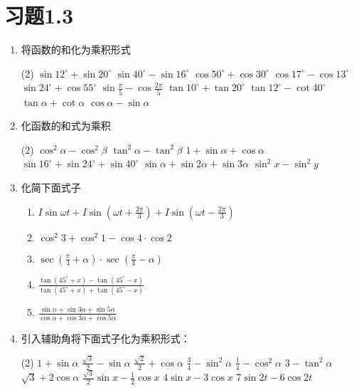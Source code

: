 \section*{习题1.3}
\begin{enumerate}
    \item 将函数的和化为乘积形式
    \begin{tasks}(2)
    \task $\sin 12^{\circ}+\sin 20^{\circ}$
    \task $\sin 40^{\circ}-\sin 16^{\circ}$
    \task $\cos 50^{\circ}+\cos 30^{\circ}$
    \task $\cos 17^{\circ}-\cos 13^{\circ} $
    \task $\sin 24^{\circ}+\cos 55^{\circ}$
    \task $\sin \frac{\pi}{5}-\cos \frac{2 \pi}{5}$
    \task $ \tan  10^{\circ}+\tan  20^{\circ}$
    \task $ \tan  12^{\circ}-\cot   40^{\circ}$
    \task $ \tan  \alpha+\cot   \alpha$ 
    \task $\cos \alpha-\sin \alpha$  
    \end{tasks}   
    \item 化函数的和式为乘积
\begin{tasks}(2)
\task  $\cos ^{2} \alpha-\cos ^{2} \beta$
\task  $\tan ^{2} \alpha-\tan ^{2} \beta$
\task  $1+\sin \alpha+\cos \alpha$
\task  $\sin 16^{\circ}+\sin 24^{\circ}+\sin 40^{\circ}$
\task     $\sin \alpha+\sin 2 \alpha+\sin 3 \alpha$
\task $\sin ^{2} x-\sin ^{2} y$   
\end{tasks}

    \item 化简下面式子
    \begin{enumerate}
    \item  $I \sin \omega t+I \sin \left(\omega t+\frac{2 \pi}{3}\right)+I \sin \left(\omega t-\frac{2 \pi}{3}\right)$
    \item  $ \cos ^{2} 3+\cos ^{2} 1-\cos 4 \cdot \cos 2$
    \item  $\sec \left(\frac{\pi}{4}+\alpha\right) \cdot \sec \left(\frac{\pi}{4}-\alpha\right)$
    \item  $\frac{\tan \left(45^{\circ}+x\right)-\tan \left(45^{\circ}-x\right)}{\tan \left(45^{\circ}+x\right)+\tan \left(45^{\circ}-x\right)}$
    \item  $\frac{\sin \alpha+\sin 3 \alpha+\sin 5 \alpha}{\cos \alpha+\cos 3 \alpha+\cos 5 \alpha}$   
    \end{enumerate}

    \item 引入辅助角将下面式子化为乘积形式：
\begin{tasks}(2)
\task $1+\sin \alpha$
\task $\frac{\sqrt{3}}{2}-\sin \alpha$
\task $\frac{\sqrt{2}}{2}+\cos \alpha$
\task $\frac{3}{4}-\sin ^{2} \alpha$
\task $\frac{1}{4}-\cos ^{2} \alpha$
\task $3-\tan^{2} \alpha$
\task $\sqrt{3}+2 \cos \alpha$
\task $\frac{\sqrt{3}}{2} \sin x-\frac{1}{2} \cos x$
\task $4 \sin x-3 \cos x$
\task $7 \sin 2 t-6 \cos 2 t$
\end{tasks}


\end{enumerate}
